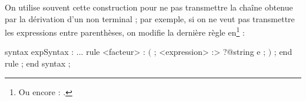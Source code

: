 On utilise souvent cette construction pour ne pas transmettre la chaîne obtenue par la dérivation d'un non terminal ; par exemple, si on ne veut pas transmettre les expressions entre parenthèses, on modifie la dernière règle  en\footnote{Ou encore : .} :
\begin{galgascode}
syntax expSyntax :
  ...
  rule <facteur> :
    $($ ;
    <expression> :> ?@string e ;
    $)$ ;
  end rule ;
end syntax ;
\end{galgascode}



